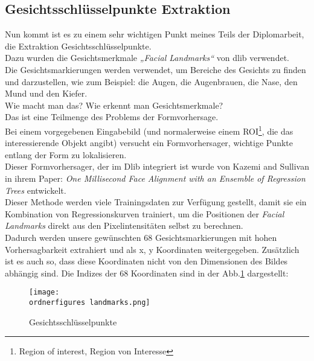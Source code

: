 \begin{flushleft}
	
\subsection{Gesichtsschlüsselpunkte Extraktion}
\label{gspex}

Nun kommt ist es zu einem sehr wichtigen Punkt meines Teils der Diplomarbeit, die Extraktion Gesichtsschlüsselpunkte. \\
Dazu wurden die Gesichtsmerkmale \textit{„Facial Landmarks“} von dlib verwendet.
\\
Die Gesichtsmarkierungen werden verwendet, um Bereiche des Gesichts zu finden
und darzustellen, wie zum Beispiel: die Augen, die Augenbrauen, die Nase, den
Mund und den Kiefer. \\
Wie macht man das? Wie erkennt man Gesichtsmerkmale? \\Das ist eine Teilmenge
des Problems der Formvorhersage.\\ Bei einem vorgegebenen Eingabebild (und
normalerweise einem ROI\footnote{Region of interest, Region von Interesse}, die
das interessierende Objekt angibt) versucht ein Formvorhersager, wichtige Punkte
entlang der Form zu lokalisieren. \\
Dieser Formvorhersager, der im Dlib integriert ist wurde von Kazemi and Sullivan
in ihrem Paper: \textit{One Millisecond Face Alignment with an Ensemble of
	Regression Trees} entwickelt.\cite{Kazemi2014OneMF} \\
Dieser Methode werden viele Trainingsdaten zur Verfügung gestellt, damit sie ein Kombination von Regressionskurven trainiert, um die Positionen der \textit{Facial Landmarks} direkt aus den Pixelintensitäten selbst zu berechnen.\cite{Kazemi2014OneMF} \\

Dadurch werden unsere gewünschten 68 Gesichtsmarkierungen mit hohen
Vorhersagbarkeit extrahiert und als x, y Koordinaten weitergegeben. 
Zusätzlich ist es auch so, dass diese Koordinaten nicht von den
Dimensionen des Bildes abhängig sind. 
Die Indizes der 68 Koordinaten sind in der Abb.\ref{fig:landmarks} dargestellt:
\\

\begin{figure}[H]
	\texttt{[image: \\ordnerfigures landmarks.png]}
	\centering
	\caption{Gesichtsschlüsselpunkte \cite{Kazemi2014OneMF}}
	\label{fig:landmarks}
\end{figure}


\end{flushleft}
